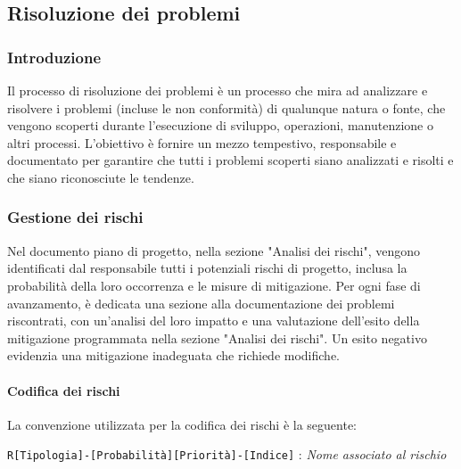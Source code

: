 \subsection{Risoluzione dei problemi}

\subsubsection{Introduzione}
Il processo di risoluzione dei problemi è un processo che mira ad analizzare e risolvere i problemi (incluse le non conformità) di qualunque natura o fonte, che vengono scoperti durante l'esecuzione di sviluppo, operazioni, manutenzione o altri processi.
L'obiettivo è fornire un mezzo tempestivo, responsabile e documentato per garantire che tutti i problemi scoperti siano analizzati e risolti e che siano riconosciute le tendenze.

\subsubsection{Gestione dei rischi}
Nel documento piano di progetto, nella sezione "Analisi dei rischi", vengono identificati dal responsabile tutti i potenziali rischi di progetto, inclusa la probabilità della loro occorrenza e le misure di mitigazione. Per ogni fase di avanzamento, è dedicata una sezione alla documentazione dei problemi riscontrati, con un'analisi del loro impatto e una valutazione dell'esito della mitigazione programmata nella sezione "Analisi dei rischi". Un esito negativo evidenzia una mitigazione inadeguata che richiede modifiche.

\paragraph{Codifica dei rischi}
La convenzione utilizzata per la codifica dei rischi è la seguente: 
\begin{center}
    \texttt{R[Tipologia]-[Probabilità][Priorità]-[Indice]} : \textit{Nome associato al rischio}
\end{center} 

